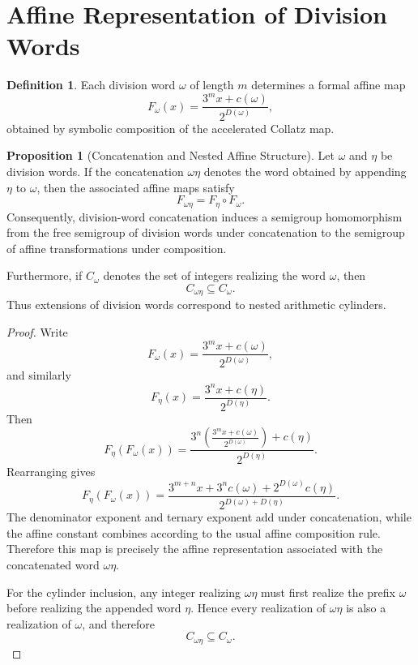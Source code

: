 \documentclass[12pt, oneside]{article}
\numberwithin{equation}{section}
\theoremstyle{definition}
\newtheorem{definition}{Definition}[section]
\newtheorem{proposition}{Proposition}[section]
\theoremstyle{plain}
\theoremstyle{remark}
\begin{document}
\section{Affine Representation of Division Words}
\label{sec:affine-representation}

\begin{definition}
Each division word \(\omega\) of length \(m\) determines a formal affine map
\[
F_\omega(x)=\frac{3^m x+c(\omega)}{2^{D(\omega)}},
\]
obtained by symbolic composition of the accelerated Collatz map.
\end{definition}

\begin{proposition}[Concatenation and Nested Affine Structure]
Let $\omega$ and $\eta$ be division words. If the concatenation
$\omega\eta$ denotes the word obtained by appending $\eta$ to $\omega$,
then the associated affine maps satisfy
\[
F_{\omega\eta} = F_\eta\circ F_\omega .
\]
Consequently, division-word concatenation induces a semigroup
homomorphism from the free semigroup of division words under
concatenation to the semigroup of affine transformations under
composition.

Furthermore, if $C_\omega$ denotes the set of integers
realizing the word $\omega$, then
\[
C_{\omega\eta}\subseteq C_\omega .
\]
Thus extensions of division words correspond to nested arithmetic
cylinders.
\end{proposition}

\begin{proof}
Write
\[
F_\omega(x) = \frac{3^{m}x+c(\omega)}{2^{D(\omega)}},
\]
and similarly
\[
F_\eta(x) = \frac{3^{n}x+c(\eta)}{2^{D(\eta)}}.
\]
Then
\[
F_\eta(F_\omega(x)) = \frac{ 3^n \left( \frac{3^m x+c(\omega)} {2^{D(\omega)}} \right)+c(\eta) } {2^{D(\eta)}}.
\]
Rearranging gives
\[
F_\eta(F_\omega(x)) = \frac{ 3^{m+n}x+3^n c(\omega)+2^{D(\omega)}c(\eta) } {2^{D(\omega)+D(\eta)}}.
\]
The denominator exponent and ternary exponent add under
concatenation, while the affine constant combines according to the
usual affine composition rule. Therefore this map is precisely the
affine representation associated with the concatenated word
$\omega\eta$.

For the cylinder inclusion, any integer realizing $\omega\eta$ must
first realize the prefix $\omega$ before realizing the appended word
$\eta$. Hence every realization of $\omega\eta$ is also a realization of
$\omega$, and therefore
\[
C_{\omega\eta}\subseteq C_\omega .
\]
\end{proof}
\end{document}
